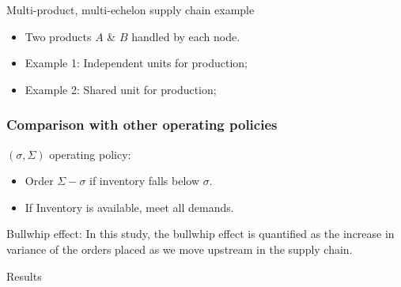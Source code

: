 \documentclass[table]{beamer}
\begin{document}
\begin{frame}{Multi-product, multi-echelon supply chain example}
\begin{figure}
\centering
\scriptsize
\resizebox{0.5\textwidth}{!}{}
\end{figure}
\begin{itemize}
\item Two products $A$ \& $B$ handled by each node.
\item \alert{Example 1}: Independent units for production;\\
  {\color{blue}{Multiobjective stage cost}}
\item \alert{Example 2}: Shared unit for production;\\
  {\color{blue}{Integrated scheduling and inventory control}}
\end{itemize}
\end{frame} 
\begin{frame}
\frametitle{Comparison with other operating policies}
\alert{$(\sigma,\Sigma)$ operating policy:}
 \begin{itemize}
   \item Order $\Sigma-\sigma$ if inventory falls below $\sigma$.
   \item If Inventory is available, meet all demands.
 \end{itemize}
\alert{Bullwhip effect}: In this study, the bullwhip effect is
  quantified as the increase in variance of the orders placed as we
  move upstream in the supply chain.
\end{frame}
\begin{frame}{Results}
\begin{figure}
\centering 
\scriptsize
\resizebox{0.75\textwidth}{!}{}
\scriptsize
\resizebox{0.75\textwidth}{!}{}
\end{figure}
\end{frame}
\end{document}
